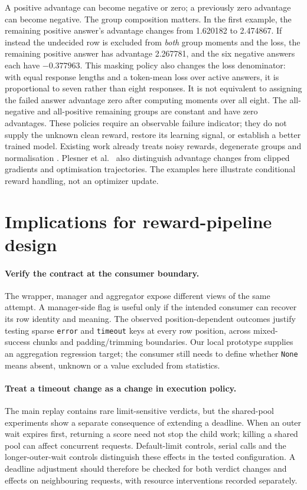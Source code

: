 \documentclass[10pt,a4paper]{article}
\let\cite\citep
\begin{document}
A positive advantage can become negative or zero; a previously zero
advantage can become negative. The group composition matters. In the first
example, the remaining positive answer's advantage changes from 1.620182
to 2.474867. If instead the undecided row is excluded from \emph{both}
group moments and the loss, the remaining positive answer has advantage
2.267781, and the six negative answers each have $-0.377963$.
This masking policy also changes the loss denominator: with equal response
lengths and a token-mean loss over active answers, it is proportional to
seven rather than eight responses. It is not equivalent to assigning the
failed answer advantage zero after computing moments over all eight.
The all-negative and all-positive remaining groups are constant and have
zero advantages. These policies require an observable failure indicator;
they do not supply the unknown clean reward, restore its learning signal,
or establish a better trained model. Existing work already treats noisy
rewards, degenerate groups and normalisation
\cite{cai2025noisy,nie2026starvation,yang2026biased}.
Plesner et al.\ \cite{plesner2026imperfect} also distinguish advantage
changes from clipped gradients and optimisation trajectories. The examples
here illustrate conditional reward handling, not an optimizer update.

\section{Implications for reward-pipeline design}
\label{sec:implications}

\paragraph{Verify the contract at the consumer boundary.}
The wrapper, manager and aggregator expose different views of the same
attempt. A manager-side flag is useful only if the intended consumer can
recover its row identity and meaning. The observed position-dependent
outcomes justify testing sparse \texttt{error} and \texttt{timeout} keys at
every row position, across mixed-success chunks and padding/trimming
boundaries. Our local prototype supplies an aggregation regression target;
the consumer still needs to define whether \texttt{None} means absent,
unknown or a value excluded from statistics.

\paragraph{Treat a timeout change as a change in execution policy.}
The main replay contains rare limit-sensitive verdicts, but the shared-pool
experiments show a separate consequence of extending a deadline. When an
outer wait expires first, returning a score need not stop the child work;
killing a shared pool can affect concurrent requests. Default-limit
controls, serial calls and the longer-outer-wait controls distinguish these
effects in the tested configuration. A deadline adjustment should therefore
be checked for both verdict changes and effects on neighbouring requests,
with resource interventions recorded separately.
\end{document}
